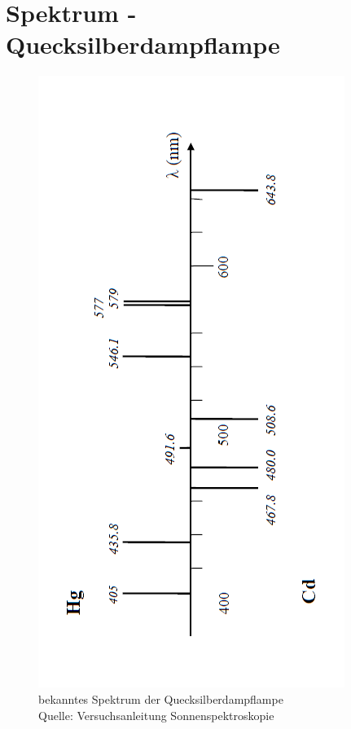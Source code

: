 

\usepackage{placeins}


	
	\vfill
	\articletitle
	\tableofcontents
	\newpage
	\thispagestyle{empty}
	\null
	\newpage
	
	\FloatBarrier
	\null
	\newpage
	
	\FloatBarrier
	\null
	\newpage
	
	\FloatBarrier
	\null
	\newpage
	
	\FloatBarrier
	\null
	\newpage
	
	\newpage


	\appendix

	\section{Spektrum - Quecksilberdampflampe} %
	\label{sec:hg_spektrum}
	
		\begin{figure}[h]
			\centering
			\includegraphics[scale = 0.75]{images/hg-cd-reference.PNG}
			\caption{bekanntes Spektrum der Quecksilberdampflampe \\ Quelle: Versuchsanleitung Sonnenspektroskopie}
			\label{fig:hg-ref}
		\end{figure}

